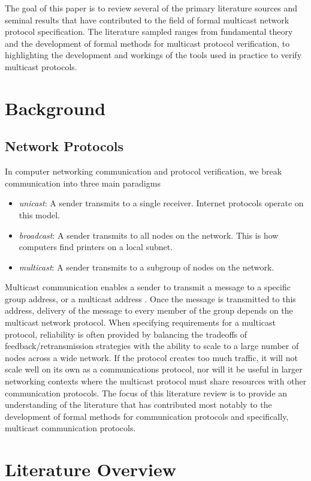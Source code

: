 \documentclass[12pt, fullpage]{article}
\begin{document}
\bigbreak
The goal of this paper is to review several of the primary literature sources and seminal results that have contributed to the field of formal multicast network protocol specification. The literature sampled ranges from fundamental theory and the development of formal methods for multicast protocol verification, to highlighting the development and workings of the tools used in practice to verify multicast protocols.

\section{Background}
\bigbreak
\subsection{Network Protocols}
In computer networking communication and protocol verification, we break communication into three main paradigms
\begin{itemize}
	\item \textit{unicast}: A sender transmits to a single receiver. Internet protocols operate on this model.
	\item \textit{broadcast}: A sender transmits to all nodes on the network. This is how computers find printers on a local subnet.
	\item \textit{multicast}: A sender transmits to a subgroup of nodes on the network.
\end{itemize}
\bigbreak
Multicast communication enables a sender to transmit a message to a specific group address, or a multicast address \cite{Lien2004FormalMA}. Once the message is transmitted to this address, delivery of the message to every member of the group depends on the multicast network protocol. When specifying requirements for a multicast protocol, reliability is often provided by balancing the tradeoffs of feedback/retransmission strategies with the ability to scale to a large number of nodes across a wide network. If the protocol creates too much traffic, it will not scale well on its own as a communications protocol, nor will it be useful in larger networking contexts where the multicast protocol must share resources with other communication protocols. The focus of this literature review is to provide an understanding of the literature that has contributed most notably to the development of formal methods for communication protocols and specifically, multicast communication protocols.

\section{Literature Overview}
\bigbreak
\end{document}
